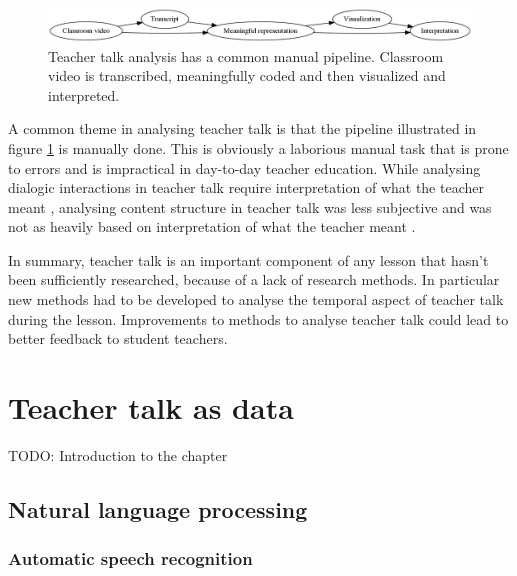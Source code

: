 \documentclass[utf8,english]{gradu3}
\begin{document}
\begin{figure}
  \includegraphics[width=\linewidth]{../figures/teacher_talk_manual_pipeline.png}
  \caption{Teacher talk analysis has a common manual pipeline. Classroom video is transcribed, meaningfully coded and then visualized and interpreted.}
  \label{fig:manualpipeline}
\end{figure}

A common theme in analysing teacher talk is that the pipeline illustrated in figure \ref{fig:manualpipeline} is manually done. This is obviously a laborious manual task that is prone to errors and is impractical in day-to-day teacher education. While analysing dialogic interactions in teacher talk require interpretation of what the teacher meant \parencite{viiriTeacherTalkPatterns2006}, analysing content structure in teacher talk was less subjective and was not as heavily based on interpretation of what the teacher meant \parencite{helaakoskiContentContentStructure2014}.

In summary, teacher talk is an important component of any lesson that hasn't been sufficiently researched, because of a lack of research methods. In particular new methods had to be developed to analyse the temporal aspect of teacher talk during the lesson. Improvements to methods to analyse teacher talk could lead to better feedback to student teachers.



\chapter{Teacher talk as data}
\label{chap:speech}

TODO: Introduction to the chapter

\section{Natural language processing}

\subsection{Automatic speech recognition}
\end{document}
